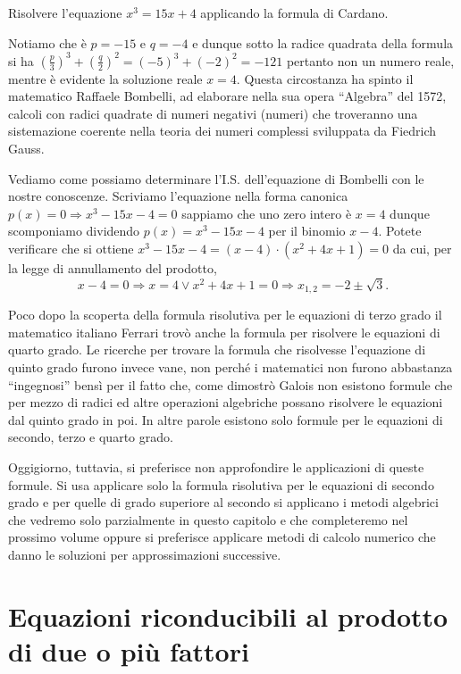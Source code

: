 \begin{esempio}
Risolvere l'equazione \(x^3=15x+4\) applicando la formula di Cardano.

Notiamo che è \(p=-15\) e \(q=-4\) e dunque sotto la radice quadrata della formula 
si ha \(\left(\frac p 3\right)^3+\left(\frac q 2\right)^2=(-5)^3+(-2)^2=-121\) 
pertanto non un numero
reale, mentre è evidente la soluzione reale \(x=4\). Questa circostanza ha spinto 
il 
matematico Raffaele Bombelli, ad elaborare nella sua opera ``Algebra'' del 
1572, 
calcoli con radici 
quadrate di numeri negativi (numeri) che troveranno una sistemazione coerente 
nella teoria dei 
numeri complessi sviluppata da Fiedrich Gauss.

Vediamo come possiamo determinare l'I.S. dell'equazione di Bombelli con le 
nostre conoscenze. Scriviamo l'equazione nella forma canonica 
\(p(x)=0\Rightarrow 
x^3-15x-4=0\) sappiamo che uno zero intero è \(x=4\) dunque scomponiamo dividendo 
\(p(x)=x^3-15x-4\) per il binomio \(x-4\). Potete verificare che si ottiene 
\(x^3-15x-4=(x-4)\cdot (x^2+4x+1)=0\) da cui, per la legge di annullamento del 
prodotto, 
\[x-4=0\Rightarrow x=4\vee x^2+4x+1=0\Rightarrow x_{1,2}=-2\pm \sqrt 3.\]

Poco dopo la scoperta della formula risolutiva per le equazioni di terzo grado 
il matematico italiano Ferrari trovò anche la formula per risolvere le 
equazioni di quarto grado. 
Le ricerche per trovare la formula che risolvesse l'equazione di quinto grado 
furono invece vane, non perché i matematici non furono abbastanza 
``ingegnosi'' bensì per il fatto che, come dimostrò Galois non esistono 
formule che per mezzo di radici ed altre operazioni algebriche possano 
risolvere le equazioni dal quinto grado in poi. In altre parole esistono 
solo formule per le equazioni di secondo, terzo e quarto grado.

Oggigiorno, tuttavia, si preferisce non approfondire le applicazioni di queste 
formule. Si usa applicare solo la formula risolutiva per le equazioni di 
secondo 
grado e per quelle di grado superiore al secondo si applicano i metodi 
algebrici che vedremo solo parzialmente in questo capitolo e che completeremo 
nel prossimo volume  oppure si preferisce applicare metodi di calcolo 
numerico che danno le soluzioni per approssimazioni successive.
\end{esempio}

\section{Equazioni riconducibili al prodotto di due o più fattori}
\label{sec:eq2gr_scomponibili}

